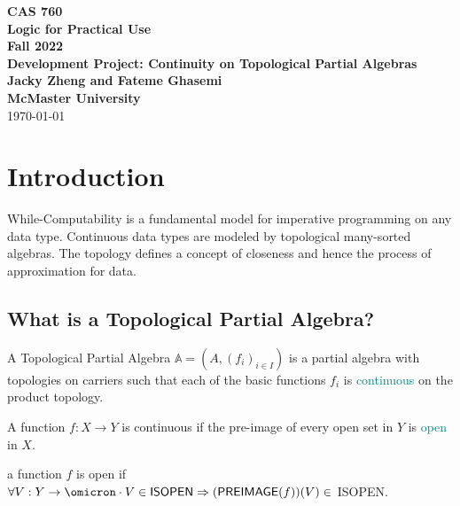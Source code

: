 \documentclass[11pt,fleqn]{article}
\begin{document}
\thispagestyle{empty}

\bc
  {\large \textbf{CAS 760}}\\[2mm]
  {\large \textbf{Logic for Practical Use}}\\[2mm]
  {\large \textbf{Fall 2022}}\\[8mm]
  {\huge \textbf{Development Project: Continuity on Topological Partial Algebras}}\\[6mm]
  {\large \textbf{Jacky Zheng and Fateme Ghasemi }}\\[2mm]
  {\large \textbf{McMaster University}}\\[6mm]
  {\large {\today}}

\ec
\newpage
\tableofcontents
\newpage
\section{Introduction}
While-Computability is a fundamental model for imperative programming on any data type.
Continuous data types are modeled by topological many-sorted algebras.
The topology defines a concept of closeness and hence the process of approximation for data.

\subsection{What is a Topological Partial Algebra?}

\begin{df}
A Topological Partial Algebra $\mathbb{A} = (A, (f_i)_{i \in I})$ is a
partial algebra with topologies on
carriers such that each of the basic functions $f_i$ is 
\textcolor{teal}{continuous} on the product topology.
\end{df}
\begin{df}
  A function $f:X \rightarrow Y $ is continuous if the pre-image of every open set in $Y$ is \textcolor{teal}{open} in $X$. 
\end{df}
\begin{df}
  a function $f$ is open if $\forall V : Y \rightarrow \omicron \cdot V \in \mName{ISOPEN} \Rightarrow (\mName{PREIMAGE}(f)) (V) \in$ ISOPEN.
\end{df}
\end{document}
